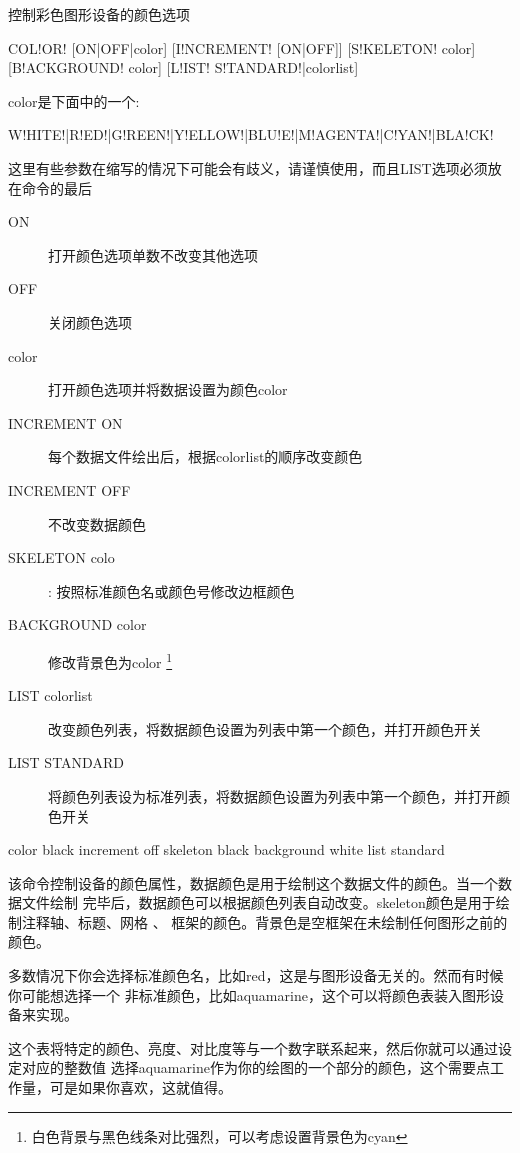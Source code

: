 \label{cmd:color}

控制彩色图形设备的颜色选项

\begin{SACSTX}
COL!OR! [ON|OFF|color] [I!NCREMENT! [ON|OFF]] [S!KELETON! color]
    [B!ACKGROUND! color] [L!IST! S!TANDARD!|colorlist]
\end{SACSTX}
color是下面中的一个:
\begin{SACSTX}
W!HITE!|R!ED!|G!REEN!|Y!ELLOW!|BLU!E!|M!AGENTA!|C!YAN!|BLA!CK!
\end{SACSTX}

这里有些参数在缩写的情况下可能会有歧义，请谨慎使用，而且LIST选项必须放在命令的最后

\begin{description}
\item [ON] 打开颜色选项单数不改变其他选项
\item [OFF] 关闭颜色选项
\item [color] 打开颜色选项并将数据设置为颜色color
\item [INCREMENT ON] 每个数据文件绘出后，根据colorlist的顺序改变颜色
\item [INCREMENT OFF] 不改变数据颜色
\item [SKELETON colo]: 按照标准颜色名或颜色号修改边框颜色
\item [BACKGROUND color] 修改背景色为color
        \footnote{白色背景与黑色线条对比强烈，可以考虑设置背景色为cyan}
\item [LIST colorlist] 改变颜色列表，将数据颜色设置为列表中第一个颜色，并打开颜色开关
\item [LIST STANDARD] 将颜色列表设为标准列表，将数据颜色设置为列表中第一个颜色，并打开颜色开关
\end{description}

\begin{SACDFT}
color black increment off skeleton black background white
    list standard
\end{SACDFT}

该命令控制设备的颜色属性，数据颜色是用于绘制这个数据文件的颜色。当一个数据文件绘制
完毕后，数据颜色可以根据颜色列表自动改变。skeleton颜色是用于绘制注释轴、标题、网格 、
框架的颜色。背景色是空框架在未绘制任何图形之前的颜色。

多数情况下你会选择标准颜色名，比如red，这是与图形设备无关的。然而有时候你可能想选择一个
非标准颜色，比如aquamarine，这个可以将颜色表装入图形设备来实现。

这个表将特定的颜色、亮度、对比度等与一个数字联系起来，然后你就可以通过设定对应的整数值
选择aquamarine作为你的绘图的一个部分的颜色，这个需要点工作量，可是如果你喜欢，这就值得。

